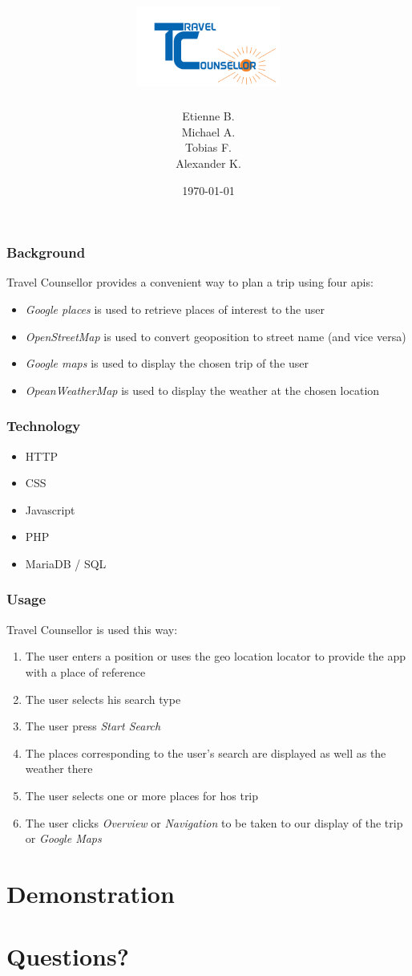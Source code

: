 \documentclass{beamer}
\title{\hspace{60px}\includegraphics[height=100px]{resources/logo.png}}
\institute{University of Innsbruck}
\date{\today}
\institute{Innsbruck University}
\author[Etienne Bertin]{Etienne B. \\ Michael A.\\ Tobias F.\\ Alexander K.}
\begin{document}
\begin{frame}
	\titlepage
\end{frame}


\begin{frame}
	\frametitle{Background}
	Travel Counsellor provides a convenient way to plan a trip using four apis:
	\begin{itemize}
		\item \textit{Google places} is used to retrieve places of interest to the user
		\item \textit{OpenStreetMap} is used to convert geoposition to street name (and vice versa)
		\item \textit{Google maps} is used to display the chosen trip of the user
		\item \textit{OpeanWeatherMap} is used to display the weather at the chosen location
	\end{itemize}
\end{frame}


\begin{frame}
	\frametitle{Technology}
	\begin{itemize}
		\item HTTP
		\item CSS
		\item Javascript
		\item PHP
		\item MariaDB / SQL
	\end{itemize}
\end{frame}


\begin{frame}
	\frametitle{Usage}
	Travel Counsellor is used this way:
	\begin{enumerate}
		\item The user enters a position or uses the geo location locator to provide the app with a place of reference
		\item The user selects his search type
		\item The user press \textit{Start Search}
		\item The places corresponding to the user's search are displayed as well as the weather there
		\item The user selects one or more places for hos trip
		\item The user clicks \textit{Overview} or \textit{Navigation} to be taken to our display of the trip or \textit{Google Maps}
	\end{enumerate}
\end{frame}


\section{Demonstration}
\section{Questions?}
\end{document}
